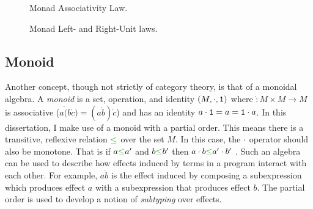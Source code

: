 \begin{figure}
        \centering
        \begin{minipage}{0.45\linewidth}
            \centering
            \begin{framed}
            \end{framed}
            \caption{Monad Associativity Law.}
            \label{MonadAssociativity}
        \end{minipage}\hfill
        \begin{minipage}{0.45\linewidth}
            \centering
            \begin{framed}
                
            \end{framed}
            \caption{Monad Left- and Right-Unit laws.}
            \label{MonadUnits}
        \end{minipage}
\end{figure}


\subsection{Monoid}

Another concept, though not strictly of category theory, is that of a monoidal algebra. A \textit{monoid} is a set, operation, and identity $(M, \dot, \1)$ where $\dot: M\times M \rightarrow M$ is associative ($a\dot(b\dot c) = (a\dot b)\dot c$) and has an identity $a\dot\1 = a = \1\dot a$. In this dissertation, I make use of a monoid with a partial order. This means there is a transitive, reflexive relation $\subeffect$ over the set $M$. In this case, the $\dot$ operator should also be monotone. That is if $a \subeffect a'$ and $b\subeffect b'$ then $a\dot b \subeffect a'\dot b'$ . Such an algebra can be used to describe how effects induced by terms in a program interact with each other. For example, $a \dot b$ is the effect induced by composing a subexpression which produces effect $a$ with a subexpression that produces effect $b$. The partial order is used to develop a notion of \textit{subtyping} over effects.

